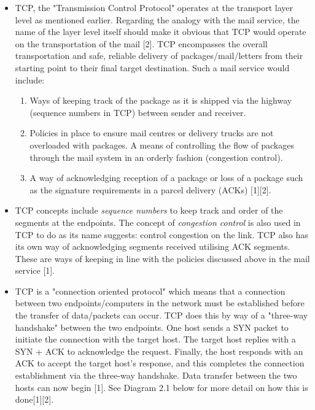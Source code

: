\documentclass{uathesis}
\begin{document}
\begin{itemize}
\item TCP, the "Transmission Control Protocol" operates at the transport layer level as mentioned earlier. Regarding the analogy with the mail service, the name of the layer level itself should make it obvious that TCP would operate on the transportation of the mail [2]. TCP encompasses the overall transportation and safe, reliable delivery of packages/mail/letters from their starting point to their final target destination. Such a mail service would include:\\
\begin{enumerate}
\item Ways of keeping track of the package as it is shipped via the highway (sequence numbers in TCP) between sender and receiver.
\item Policies in place to ensure mail centres or delivery trucks are not overloaded with packages. A means of controlling the flow of packages through the mail system in an orderly fashion (congestion control).
\item A way of acknowledging reception of a package or loss of a package such as the signature requirements in a parcel delivery (ACKs) [1][2].\\
\end{enumerate}

\item TCP concepts include \emph{sequence numbers} to keep track and order of the segments at the endpoints. The concept of \emph{congestion control} is also used in TCP to do as its name suggests: control congestion on the link. TCP also has its own way of acknowledging segments received utilising ACK segments. These are ways of keeping in line with the policies discussed above in the mail service [1].\\

\item TCP is a "connection oriented protocol" which means that a connection between two endpoints/computers in the network must be established before the transfer of data/packets can occur. TCP does this by way of a "three-way handshake" between the two endpoints. One host sends a SYN packet to initiate the connection with the target host. The target host replies with a SYN + ACK to acknowledge the request. Finally, the host responds with an ACK to accept the target host's response, and this completes the connection establishment via the three-way handshake. Data transfer between the two hosts can now begin [1]. See Diagram 2.1 below for more detail on how this is done[1][2].  \\


\end{itemize}
\end{document}
